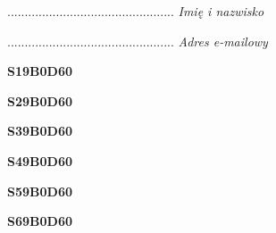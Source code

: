 \begin{turn}{90}\begin{minipage}{\linewidth} \vspace{20mm} ................................................  \textit{Imię i nazwisko}\end{minipage}\end{turn}

\begin{turn}{90}\begin{minipage}{\linewidth} \vspace{20mm} ................................................  \textit{Adres e-mailowy}\end{minipage}\end{turn}

\begin{turn}{90}\huge \begin{minipage}{\linewidth} \vspace{10mm}\textbf{S19B0D60}\end{minipage}\end{turn}

\begin{turn}{90}\huge \begin{minipage}{\linewidth} \vspace{10mm}\textbf{S29B0D60}\end{minipage}\end{turn}

\begin{turn}{90}\huge \begin{minipage}{\linewidth} \vspace{10mm}\textbf{S39B0D60}\end{minipage}\end{turn}

\begin{turn}{90}\huge \begin{minipage}{\linewidth} \vspace{10mm}\textbf{S49B0D60}\end{minipage}\end{turn}

\begin{turn}{90}\huge \begin{minipage}{\linewidth} \vspace{10mm}\textbf{S59B0D60}\end{minipage}\end{turn}

\begin{turn}{90}\huge \begin{minipage}{\linewidth} \vspace{10mm}\textbf{S69B0D60}\end{minipage}\end{turn}

